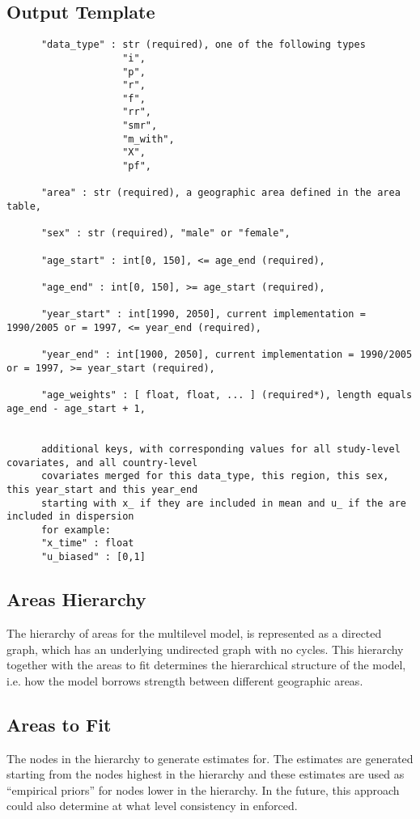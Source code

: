 \subsection{Output Template}
\begin{verbatim}
      "data_type" : str (required), one of the following types
                    "i",
                    "p",
                    "r",
                    "f",
                    "rr",
                    "smr",
                    "m_with",
                    "X",
                    "pf", 

      "area" : str (required), a geographic area defined in the area table,

      "sex" : str (required), "male" or "female",

      "age_start" : int[0, 150], <= age_end (required),

      "age_end" : int[0, 150], >= age_start (required),

      "year_start" : int[1990, 2050], current implementation = 1990/2005 or = 1997, <= year_end (required),

      "year_end" : int[1900, 2050], current implementation = 1990/2005 or = 1997, >= year_start (required),

      "age_weights" : [ float, float, ... ] (required*), length equals age_end - age_start + 1,


      additional keys, with corresponding values for all study-level covariates, and all country-level   
      covariates merged for this data_type, this region, this sex, this year_start and this year_end
      starting with x_ if they are included in mean and u_ if the are included in dispersion
      for example:
      "x_time" : float
      "u_biased" : [0,1]
\end{verbatim}

\subsection{Areas Hierarchy}
The hierarchy of areas for the multilevel model, is represented as a
directed graph, which has an underlying undirected graph with no
cycles.  This hierarchy together with the areas to fit determines the
hierarchical structure of the model, i.e. how the model borrows
strength between different geographic areas.

\subsection{Areas to Fit}
The nodes in the hierarchy to generate estimates for.  The estimates
are generated starting from the nodes highest in the hierarchy and
these estimates are used as ``empirical priors'' for nodes lower in
the hierarchy.  In the future, this approach could also determine at
what level consistency in enforced.
